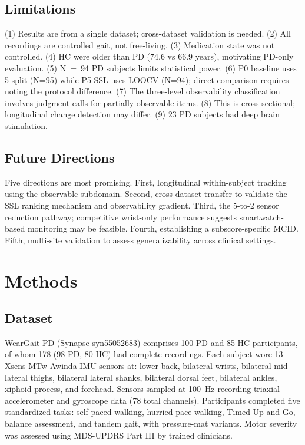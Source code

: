 \documentclass[11pt]{article}
\begin{document}
\subsection{Limitations}

(1) Results are from a single dataset; cross-dataset validation is needed. (2) All recordings are controlled gait, not free-living. (3) Medication state was not controlled. (4) HC were older than PD (74.6 vs 66.9 years), motivating PD-only evaluation. (5) N~=~94 PD subjects limits statistical power. (6) P0 baseline uses 5-split (N=95) while P5 SSL uses LOOCV (N=94); direct comparison requires noting the protocol difference. (7) The three-level observability classification involves judgment calls for partially observable items. (8) This is cross-sectional; longitudinal change detection may differ. (9) 23 PD subjects had deep brain stimulation.

\subsection{Future Directions}

Five directions are most promising. First, longitudinal within-subject tracking using the observable subdomain. Second, cross-dataset transfer to validate the SSL ranking mechanism and observability gradient. Third, the 5-to-2 sensor reduction pathway; competitive wrist-only performance suggests smartwatch-based monitoring may be feasible. Fourth, establishing a subscore-specific MCID. Fifth, multi-site validation to assess generalizability across clinical settings.

\section{Methods}

\subsection{Dataset}

WearGait-PD\cite{weargait} (Synapse syn55052683) comprises 100 PD and 85 HC participants, of whom 178 (98 PD, 80 HC) had complete recordings. Each subject wore 13 Xsens MTw Awinda IMU sensors at: lower back, bilateral wrists, bilateral mid-lateral thighs, bilateral lateral shanks, bilateral dorsal feet, bilateral ankles, xiphoid process, and forehead. Sensors sampled at 100~Hz recording triaxial accelerometer and gyroscope data (78 total channels). Participants completed five standardized tasks: self-paced walking, hurried-pace walking, Timed Up-and-Go, balance assessment, and tandem gait, with pressure-mat variants. Motor severity was assessed using MDS-UPDRS Part III by trained clinicians.
\end{document}
